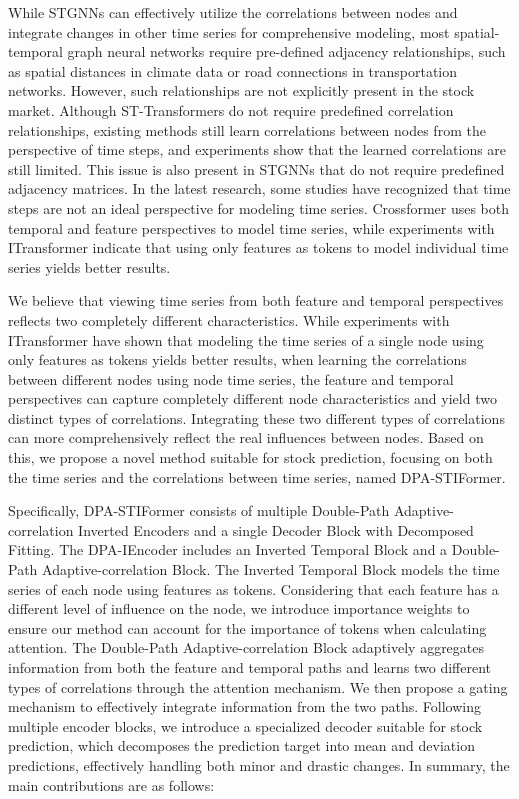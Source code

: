 While STGNNs can effectively utilize the correlations between nodes and integrate changes in other time series for comprehensive modeling, most spatial-temporal graph neural networks require pre-defined adjacency relationships, such as spatial distances in climate data or road connections in transportation networks. However, such relationships are not explicitly present in the stock market. Although ST-Transformers do not require predefined correlation relationships, existing methods still learn correlations between nodes from the perspective of time steps, and experiments show that the learned correlations are still limited. This issue is also present in STGNNs that do not require predefined adjacency matrices. In the latest research, some studies have recognized that time steps are not an ideal perspective for modeling time series. Crossformer uses both temporal and feature perspectives to model time series, while experiments with ITransformer indicate that using only features as tokens to model individual time series yields better results.

We believe that viewing time series from both feature and temporal perspectives reflects two completely different characteristics. While experiments with ITransformer have shown that modeling the time series of a single node using only features as tokens yields better results, when learning the correlations between different nodes using node time series, the feature and temporal perspectives can capture completely different node characteristics and yield two distinct types of correlations. Integrating these two different types of correlations can more comprehensively reflect the real influences between nodes. Based on this, we propose a novel method suitable for stock prediction, focusing on both the time series and the correlations between time series, named DPA-STIFormer.

Specifically, DPA-STIFormer consists of multiple Double-Path Adaptive-correlation Inverted Encoders and a single Decoder Block with Decomposed Fitting. The DPA-IEncoder includes an Inverted Temporal Block and a Double-Path Adaptive-correlation Block. The Inverted Temporal Block models the time series of each node using features as tokens. Considering that each feature has a different level of influence on the node, we introduce importance weights to ensure our method can account for the importance of tokens when calculating attention. The Double-Path Adaptive-correlation Block adaptively aggregates information from both the feature and temporal paths and learns two different types of correlations through the attention mechanism. We then propose a gating mechanism to effectively integrate information from the two paths. Following multiple encoder blocks, we introduce a specialized decoder suitable for stock prediction, which decomposes the prediction target into mean and deviation predictions, effectively handling both minor and drastic changes. In summary, the main contributions are as follows:

